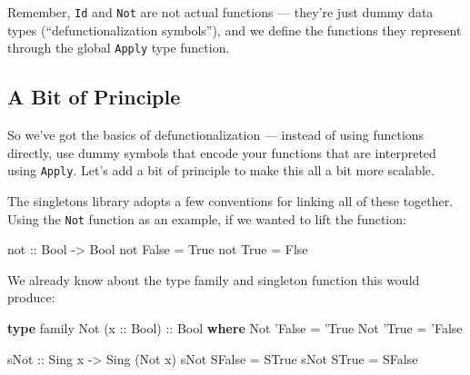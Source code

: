 \documentclass[]{article}
\newenvironment{Shaded}{}{}
\newcommand{\DataTypeTok}[1]{\textcolor[rgb]{0.56,0.13,0.00}{#1}}
\newcommand{\FunctionTok}[1]{\textcolor[rgb]{0.02,0.16,0.49}{#1}}
\newcommand{\KeywordTok}[1]{\textcolor[rgb]{0.00,0.44,0.13}{\textbf{#1}}}
\newcommand{\NormalTok}[1]{#1}
\newcommand{\OtherTok}[1]{\textcolor[rgb]{0.00,0.44,0.13}{#1}}
\begin{document}
Remember, \texttt{Id} and \texttt{Not} are not actual functions --- they're just
dummy data types (``defunctionalization symbols''), and we define the functions
they represent through the global \texttt{Apply} type function.

\hypertarget{a-bit-of-principle}{%
\subsection{A Bit of Principle}\label{a-bit-of-principle}}

So we've got the basics of defunctionalization --- instead of using functions
directly, use dummy symbols that encode your functions that are interpreted
using \texttt{Apply}. Let's add a bit of principle to make this all a bit more
scalable.

The singletons library adopts a few conventions for linking all of these
together. Using the \texttt{Not} function as an example, if we wanted to lift
the function:

\begin{Shaded}
\begin{Highlighting}[]
\NormalTok{not}\OtherTok{ ::} \DataTypeTok{Bool} \OtherTok{->} \DataTypeTok{Bool}
\NormalTok{not }\DataTypeTok{False} \FunctionTok{=} \DataTypeTok{True}
\NormalTok{not }\DataTypeTok{True}  \FunctionTok{=} \DataTypeTok{Flse}
\end{Highlighting}
\end{Shaded}

We already know about the type family and singleton function this would produce:

\begin{Shaded}
\begin{Highlighting}[]
\KeywordTok{type}\NormalTok{ family }\DataTypeTok{Not}\NormalTok{ (}\OtherTok{x ::} \DataTypeTok{Bool}\NormalTok{)}\OtherTok{ ::} \DataTypeTok{Bool} \KeywordTok{where}
    \DataTypeTok{Not}\NormalTok{ '}\DataTypeTok{False} \FunctionTok{=}\NormalTok{ '}\DataTypeTok{True}
    \DataTypeTok{Not}\NormalTok{ '}\DataTypeTok{True}  \FunctionTok{=}\NormalTok{ '}\DataTypeTok{False}

\OtherTok{sNot ::} \DataTypeTok{Sing}\NormalTok{ x }\OtherTok{->} \DataTypeTok{Sing}\NormalTok{ (}\DataTypeTok{Not}\NormalTok{ x)}
\NormalTok{sNot }\DataTypeTok{SFalse} \FunctionTok{=} \DataTypeTok{STrue}
\NormalTok{sNot }\DataTypeTok{STrue}  \FunctionTok{=} \DataTypeTok{SFalse}
\end{Highlighting}
\end{Shaded}
\end{document}
